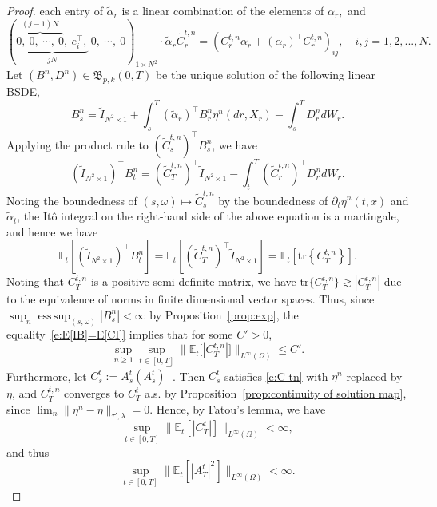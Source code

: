 \documentclass[11pt,reqno]{amsart}
\DeclareMathOperator*{\esssup}{ess\,sup}
\numberwithin{equation}{section}
\begin{document}
\begin{proof}
each entry of $\tilde{\alpha}_r$ is a linear combination of the elements of $\alpha_r,$ and
\begin{equation*}
(\underbrace{\overbrace{ 0,\ 0,\ \cdots,\ 0}^{(j-1)N},\ e^{\top}_{i},}_{jN}\ 0,\ \cdots,\ 0
)_{1\times N^{2}}\cdot\tilde{\alpha}_r\tilde{C}^{t,n}_{r} = \left(C^{t,n}_{r}\alpha_r + (\alpha_r)^{\top}C^{t,n}_{r}\right)_{ij},\quad i,j=1,2,...,N.
\end{equation*}
Let $(B^{n},D^{n})\in\mathfrak{B}_{p,k}(0,T)$ be the unique solution of the following linear BSDE,
\begin{equation*}
B^{n}_{s} = \tilde{I}_{N^{2}\times 1} + \int_{s}^{T}(\tilde{\alpha}_r)^{\top} B^{n}_{r} \eta^{n}(dr,X_r) - \int_{s}^{T} D^{n}_r d W_r.
\end{equation*}
Applying the product rule to $(\tilde{C}^{t,n}_{s})^{\top}B^{n}_{s}$,  we have 
\begin{equation*}
(\tilde{I}_{N^{2}\times 1})^{\top}B^{n}_{t} = (\tilde{C}^{t,n}_{T})^{\top}\tilde{I}_{N^{2}\times 1} - \int_{t}^{T} (\tilde{C}^{t,n}_{r})^{\top} D^{n}_r  d W_r.
\end{equation*}
Noting the boundedness of $(s,\omega)\mapsto\tilde{C}^{t,n}_{s}$ by the boundedness of $\partial_{t}\eta^{n}(t,x)$ and $\tilde{\alpha}_{t}$, the It\^o integral on the right-hand side of the above equation is a martingale, and hence we have
\begin{equation}\label{e:E[IB]=E[CI]}
\mathbb{E}_{t}\left[(\tilde{I}_{N^{2}\times 1})^{\top}B^{n}_{t}\right] = \mathbb{E}_{t}\left[(\tilde{C}^{t,n}_{T})^{\top}\tilde{I}_{N^{2}\times 1}\right] = \mathbb{E}_t\left[\text{tr}\left\{C^{t,n}_{T}\right\}\right].
\end{equation}
Noting that $C^{t,n}_{T}$ is a positive  semi-definite matrix, we have $\text{tr}\{C^{t,n}_{T}\}\gtrsim |C^{t,n}_{T}|$ due to the equivalence of norms in finite dimensional vector spaces. Thus, since 
$\sup_{n}\esssup_{(s,\omega)}|B^{n}_{s}|<\infty$ by Proposition~\ref{prop:exp}, the equality~\eqref{e:E[IB]=E[CI]} implies that for some $C'>0$,
\[\sup_{n\ge 1}\sup_{t\in[0,T]}\big\|\mathbb{E}_{t}\big[|C^{t,n}_{T}|\big]\big\|_{L^{\infty}(\Omega)}\le C'.\]
Furthermore, let $C^{t}_{s}:=A^{t}_{s}(A^{t}_{s})^{\top}$. Then $C^{t}_{s}$ satisfies \eqref{e:C tn} with $\eta^n$ replaced by $\eta$,  and $C^{t,n}_{T}$ converges to $C^{t}_{T}$ a.s. by Proposition~\ref{prop:continuity of solution map}, since $\lim_{n}\|\eta^{n} - \eta\|_{\tau',\lambda}= 0$. Hence, by Fatou's lemma, we have 
\begin{equation*}
\sup_{t\in[0,T]}\|\mathbb{E}_{t}\left[|C^{t}_{T}|\right]\|_{L^{\infty}(\Omega)}<\infty,
\end{equation*}
and thus
\begin{equation}\label{e:A^2k}
\sup_{t\in[0,T]}\|\mathbb{E}_{t}\left[|A^{t}_{T}|^{2}\right]\|_{L^{\infty}(\Omega)}<\infty.
\end{equation}



\end{proof}
\end{document}
